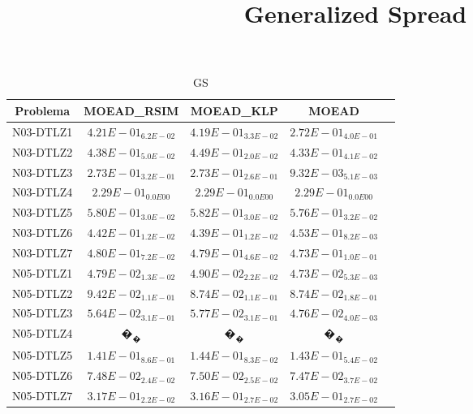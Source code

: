 \documentclass{article}
\title{Generalized Spread}
\author{}
\begin{document}
\maketitle
\begin{table*}[ht!]
\scriptsize
\caption{GS}
\centering\begin{tabular}{|c||c||c||c||c|} \hline
Problema &MOEAD_RSIM &MOEAD_KLP &MOEAD\\\hline
N03-DTLZ1 &$4.21E-01_{6.2E-02}$ &\cellcolor{gray25}$4.19E-01_{3.3E-02}$ &\cellcolor{gray95}$2.72E-01_{4.0E-01}$\\ 
\hline
N03-DTLZ2 &\cellcolor{gray25}$4.38E-01_{5.0E-02}$ &$4.49E-01_{2.0E-02}$ &\cellcolor{gray95}$4.33E-01_{4.1E-02}$\\ 
\hline
N03-DTLZ3 &$2.73E-01_{3.2E-01}$ &\cellcolor{gray25}$2.73E-01_{2.6E-01}$ &\cellcolor{gray95}$9.32E-03_{5.1E-03}$\\ 
\hline
N03-DTLZ4 &\cellcolor{gray95}$2.29E-01_{0.0E00}$ &\cellcolor{gray25}$2.29E-01_{0.0E00}$ &$2.29E-01_{0.0E00}$\\ 
\hline
N03-DTLZ5 &\cellcolor{gray25}$5.80E-01_{3.0E-02}$ &$5.82E-01_{3.0E-02}$ &\cellcolor{gray95}$5.76E-01_{3.2E-02}$\\ 
\hline
N03-DTLZ6 &\cellcolor{gray25}$4.42E-01_{1.2E-02}$ &\cellcolor{gray95}$4.39E-01_{1.2E-02}$ &$4.53E-01_{8.2E-03}$\\ 
\hline
N03-DTLZ7 &$4.80E-01_{7.2E-02}$ &\cellcolor{gray25}$4.79E-01_{4.6E-02}$ &\cellcolor{gray95}$4.73E-01_{1.0E-01}$\\ 
\hline
N05-DTLZ1 &\cellcolor{gray25}$4.79E-02_{1.3E-02}$ &$4.90E-02_{2.2E-02}$ &\cellcolor{gray95}$4.73E-02_{5.3E-03}$\\ 
\hline
N05-DTLZ2 &$9.42E-02_{1.1E-01}$ &\cellcolor{gray95}$8.74E-02_{1.1E-01}$ &\cellcolor{gray25}$8.74E-02_{1.8E-01}$\\ 
\hline
N05-DTLZ3 &\cellcolor{gray25}$5.64E-02_{3.1E-01}$ &$5.77E-02_{3.1E-01}$ &\cellcolor{gray95}$4.76E-02_{4.0E-03}$\\ 
\hline
N05-DTLZ4 &\cellcolor{gray25}$�_{�}$ &$�_{�}$ &$�_{�}$\\ 
\hline
N05-DTLZ5 &\cellcolor{gray95}$1.41E-01_{8.6E-01}$ &$1.44E-01_{8.3E-02}$ &\cellcolor{gray25}$1.43E-01_{5.4E-02}$\\ 
\hline
N05-DTLZ6 &\cellcolor{gray25}$7.48E-02_{2.4E-02}$ &$7.50E-02_{2.5E-02}$ &\cellcolor{gray95}$7.47E-02_{3.7E-02}$\\ 
\hline
N05-DTLZ7 &$3.17E-01_{2.2E-02}$ &\cellcolor{gray25}$3.16E-01_{2.7E-02}$ &\cellcolor{gray95}$3.05E-01_{2.7E-02}$\\ 

\end{tabular}
\end{table*}
\end{document}
